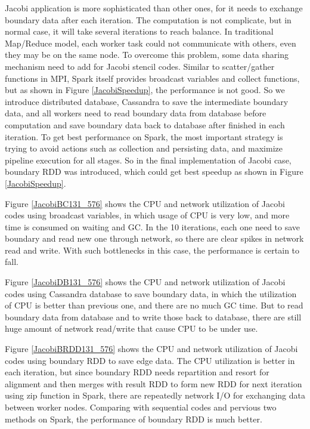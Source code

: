 Jacobi application is more sophisticated than other ones, for it needs to exchange boundary data after each iteration. The computation is not complicate, but in normal case, it will take several iterations to reach balance. In traditional Map/Reduce model, each worker task could not communicate with others, even they may be on the same node. To overcome this problem, some data sharing mechanism need to add for Jacobi stencil codes. Similar to scatter/gather functions in MPI, Spark itself provides broadcast variables and collect functions, but as shown in Figure \ref{JacobiSpeedup}, the performance is not good. So we introduce distributed database, Cassandra to save the intermediate boundary data, and all workers need to read boundary data from database before computation and save boundary data back to database after finished in each iteration. To get best performance on Spark, the most important strategy is trying to avoid actions such as collection and persisting data, and maximize pipeline execution for all stages. So in the final implementation of Jacobi case, boundary RDD was introduced, which could get best speedup as shown in Figure \ref{JacobiSpeedup}.

Figure \ref{JacobiBC131_576} shows the CPU and network utilization of Jacobi codes using broadcast variables, in which usage of CPU is very low, and more time is consumed on waiting and GC. In the 10 iterations, each one need to save boundary and read new one through network, so there are clear spikes in network read and write. With such bottlenecks in this case, the performance is certain to fall. 

Figure \ref{JacobiDB131_576} shows the CPU and network utilization of Jacobi codes using Cassandra database to save boundary data, in which the utilization of CPU is better than previous one, and there are no much GC time. But to read boundary data from database and to write those back to database, there are still huge amount of network read/write that cause CPU to be under use.

Figure \ref{JacobiBRDD131_576} shows the CPU and network utilization of Jacobi codes using boundary RDD to save edge data. The CPU utilization is better in each iteration, but since boundary RDD needs repartition and resort for alignment and then merges with result RDD to form new RDD for next iteration using zip function in Spark, there are repeatedly network I/O for exchanging data between worker nodes. Comparing with sequential codes and pervious two methods on Spark, the performance of boundary RDD is much better. 


